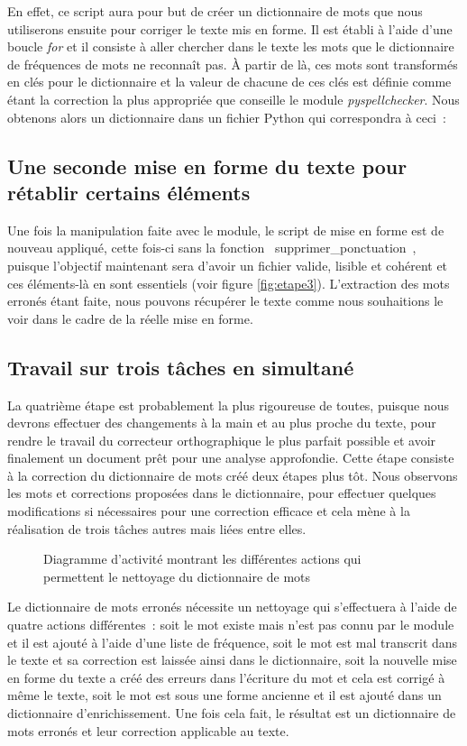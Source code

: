 En effet, ce script aura pour but de créer un dictionnaire de mots que nous utiliserons ensuite pour corriger le texte mis en forme. Il est établi à l'aide d'une boucle \textit{for} et il consiste à aller chercher dans le texte les mots que le dictionnaire de fréquences de mots ne reconnaît pas. À partir de là, ces mots sont transformés en clés pour le dictionnaire et la valeur de chacune de ces clés est définie comme étant la correction la plus appropriée que conseille le module \emph{pyspellchecker}. Nous obtenons alors un dictionnaire dans un fichier Python qui correspondra à ceci~: 

\subsection{Une seconde mise en forme du texte pour rétablir certains éléments}
Une fois la manipulation faite avec le module, le script de mise en forme est de nouveau appliqué, cette fois-ci sans la fonction \og~supprimer\_ponctuation~\fg{}, puisque l'objectif maintenant sera d'avoir un fichier valide, lisible et cohérent et ces éléments-là en sont essentiels (voir figure \ref{fig:etape3}). L'extraction des mots erronés étant faite, nous pouvons récupérer le texte comme nous souhaitions le voir dans le cadre de la réelle mise en forme.

\subsection{Travail sur trois tâches en simultané}
La quatrième étape est probablement la plus rigoureuse de toutes, puisque nous devrons effectuer des changements à la main et au plus proche du texte, pour rendre le travail du correcteur orthographique le plus parfait possible et avoir finalement un document prêt pour une analyse approfondie. Cette étape consiste à la correction du dictionnaire de mots créé deux étapes plus tôt. Nous observons les mots et corrections proposées dans le dictionnaire, pour effectuer quelques modifications si nécessaires pour une correction efficace et cela mène à la réalisation de trois tâches autres mais liées entre elles.
\begin{figure}[H]
    \centering
    \caption{Diagramme d'activité montrant les différentes actions qui permettent le nettoyage du dictionnaire de mots}
    \label{fig:etape4}
\end{figure}
Le dictionnaire de mots erronés nécessite un nettoyage qui s'effectuera à l'aide de quatre actions différentes~: soit le mot existe mais n'est pas connu par le module et il est ajouté à l'aide d'une liste de fréquence, soit le mot est mal transcrit dans le texte et sa correction est laissée ainsi dans le dictionnaire, soit la nouvelle mise en forme du texte a créé des erreurs dans l'écriture du mot et cela est corrigé à même le texte, soit le mot est sous une forme ancienne et il est ajouté dans un dictionnaire d'enrichissement. Une fois cela fait, le résultat est un dictionnaire de mots erronés et leur correction applicable au texte.

